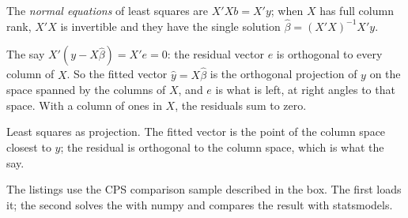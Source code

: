 \begin{definition}\label{def:b2:multiple-regression:normal-equations}
The \emph{normal equations} of least squares are $X'Xb = X'y$; when $X$ has full column rank,
$X'X$ is invertible and they have the single solution $\hat\beta = (X'X)^{-1}X'y$.
\end{definition}

The  say $X'(y - X\hat\beta) = X'e = 0$: the residual vector $e$ is orthogonal to every column of $X$. So
the fitted vector $\hat y = X\hat\beta$ is the orthogonal projection of $y$ on the space spanned by the columns of $X$, and
$e$ is what is left, at right angles to that space. With a column of ones in $X$, the residuals sum to zero.

\begin{omfigure}

{\small Least squares as projection. The fitted vector is the point of the column space closest to $y$; the residual is
orthogonal to the column space, which is what the  say.}
\end{omfigure}

The listings use the CPS comparison sample described in the box. The first loads it; the second solves the  with numpy and compares the result with statsmodels.

